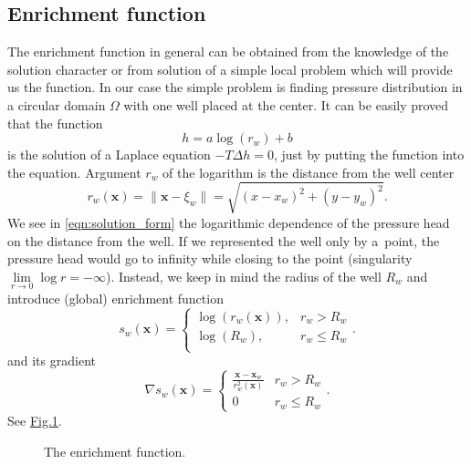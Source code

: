 \documentclass[preprint,12pt,authoryear]{elsarticle}
\newcommand{\fig}[1]{\hyperref[#1]{Fig.\ref{#1}}}
\newcommand{\figpath}{../graphics/}
\newcommand{\bx}{\mathbf{x}}
\begin{document}
\subsection{Enrichment function}
The enrichment function in general can be obtained from the knowledge of the solution character or 
from solution of a simple local problem which will provide us the function.
In our case the simple problem is finding pressure distribution in a circular domain $\Omega$ with one well 
placed at the center. It can be easily proved that the function
%
\begin{equation} \label{eqn:solution_form}
  h = a \log(r_w)+b
\end{equation}
%
is the solution of a Laplace equation $-T \Delta h = 0$, just by putting the function into the equation. 
Argument $r_w$ of the logarithm is the distance from the well center
%
\begin{equation*}
      r_w(\bx) = \|\bx - \xi_w\|= \sqrt{(x-x_w)^2+(y-y_w)^2}.
\end{equation*}
%
We see in \eqref{eqn:solution_form} the logarithmic dependence of the pressure head on the distance from 
the well. If we represented the well only by a~point, the pressure head would go to infinity while closing 
to the point (singularity $\lim \limits_{r\rightarrow 0} \log r= -\infty$). Instead, we keep in mind the
radius of the well $R_w$ and introduce (global) enrichment function
%
\begin{equation}
\label{eqn:enrich_func}
s_w(\bx) = 
  \begin{cases}
  \log(r_w(\bx)), & r_w > R_w\\
  \log(R_w), & r_w \le R_w\\
  \end{cases}.
\end{equation}
%
and its gradient
\begin{equation} \label{eqn:xgrad_func}
\nabla s_w(\bx) = 
  \begin{cases}  
    \frac{\bx - \bx_w}{r_w^2(\bx)} & r_w>R_w \\
    0 & r_w \leq R_w
  \end{cases}.
\end{equation}
See \fig{fig:enrich_func}.
\begin{figure}[!htb]
  \begin{center}         
    \def\svgwidth{0.5\textwidth}
    
  \end{center}
  \caption{The enrichment function.}
  \label{fig:enrich_func}
\end{figure}
\end{document}
